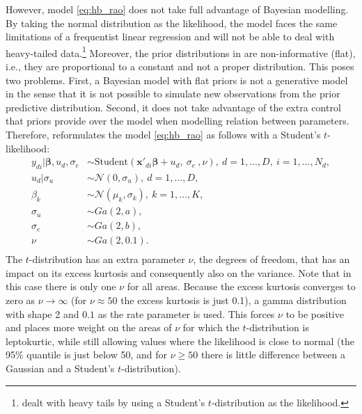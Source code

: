 However, model \ref{eq:hb_rao} does not take full advantage of Bayesian modelling.
By taking the normal distribution as the likelihood, the model faces the same limitations of a frequentist linear regression and will not be able to deal with heavy-tailed data.\footnote{\cite{morelli_hierarchical_2021} dealt with heavy tails by using a Student's $t$-distribution as the likelihood.}
Moreover, the prior distributions in \cite{molina_small_2014} are non-informative (flat), i.e., they are proportional to a constant and not a proper distribution.
This poses two problems.
First, a Bayesian model with flat priors is not a generative model in the sense that it is not possible to simulate new observations from the prior predictive distribution.
Second, it does not take advantage of the extra control that priors provide over the model when modelling relation between parameters.
Therefore, \cite{morelli_hierarchical_2021} reformulates the model \ref{eq:hb_rao} as follows with a Student's $t$-likelihood:
\begin{equation}
	\begin{split}
		y_{di} |\boldsymbol \beta, u_d, \sigma_e & \sim
            \text{Student}(\boldsymbol{x'}_{di} \boldsymbol \beta + u_d,\ \sigma_e\ , \nu),\ d = 1, ..., D,\ i = 1, ..., N_d, \\
		u_d | \sigma_u & \sim \mathcal N(0, \sigma_u),\ d = 1, ..., D, \\
		\beta_k & \sim \mathcal N(\mu_k, \sigma_k),\ k = 1, ..., K,\\
		\sigma_u & \sim Ga(2, a), \\
		\sigma_e & \sim Ga(2, b), \\
		\nu & \sim Ga(2, 0.1). \\
	\end{split}
	\label{eq:mod_hb}
\end{equation}
The $t$-distribution has an extra parameter $\nu$, the degrees of freedom, that has an impact on its excess kurtosis and consequently also on the variance.
Note that in this case there is only one $\nu$ for all areas.
Because the excess kurtosis converges to zero as $\nu \rightarrow \infty$  (for $\nu \approx 50$ the excess kurtosis is just 0.1), a gamma distribution with shape 2 and $0.1$ as the rate parameter is used.
This forces $\nu$ to be positive and places more weight on the areas of $\nu$ for which the $t$-distribution is leptokurtic, while still allowing values where the likelihood is close to normal (the 95\% quantile is just below 50, and for $\nu \ge 50$ there is little difference between a Gaussian and a Student's $t$-distribution).
